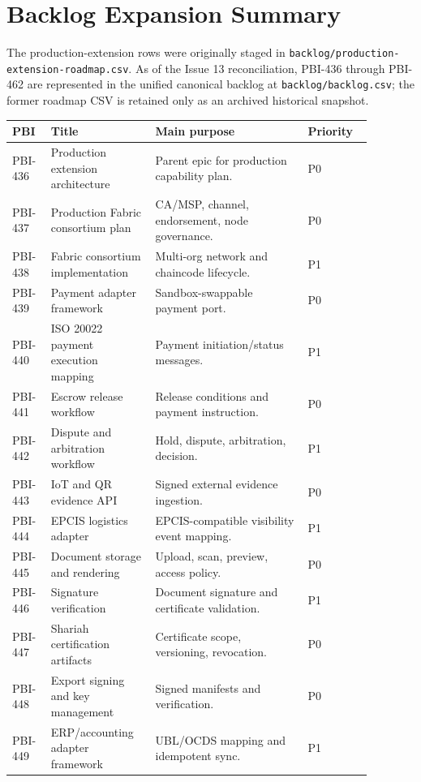 \documentclass[11pt]{article}
\newcommand{\code}[1]{\texttt{#1}}
\begin{document}
\section{Backlog Expansion Summary}

The production-extension rows were originally staged in \code{backlog/production-extension-roadmap.csv}. As of the Issue 13 reconciliation, PBI-436 through PBI-462 are represented in the unified canonical backlog at \code{backlog/backlog.csv}; the former roadmap CSV is retained only as an archived historical snapshot.

\begin{longtable}{p{0.09\linewidth}p{0.25\linewidth}p{0.38\linewidth}p{0.16\linewidth}}
\toprule
PBI & Title & Main purpose & Priority \\
\midrule
PBI-436 & Production extension architecture & Parent epic for production capability plan. & P0 \\
PBI-437 & Production Fabric consortium plan & CA/MSP, channel, endorsement, node governance. & P0 \\
PBI-438 & Fabric consortium implementation & Multi-org network and chaincode lifecycle. & P1 \\
PBI-439 & Payment adapter framework & Sandbox-swappable payment port. & P0 \\
PBI-440 & ISO 20022 payment execution mapping & Payment initiation/status messages. & P1 \\
PBI-441 & Escrow release workflow & Release conditions and payment instruction. & P0 \\
PBI-442 & Dispute and arbitration workflow & Hold, dispute, arbitration, decision. & P1 \\
PBI-443 & IoT and QR evidence API & Signed external evidence ingestion. & P0 \\
PBI-444 & EPCIS logistics adapter & EPCIS-compatible visibility event mapping. & P1 \\
PBI-445 & Document storage and rendering & Upload, scan, preview, access policy. & P0 \\
PBI-446 & Signature verification & Document signature and certificate validation. & P1 \\
PBI-447 & Shariah certification artifacts & Certificate scope, versioning, revocation. & P0 \\
PBI-448 & Export signing and key management & Signed manifests and verification. & P0 \\
PBI-449 & ERP/accounting adapter framework & UBL/OCDS mapping and idempotent sync. & P1 \\

\end{longtable}
\end{document}
